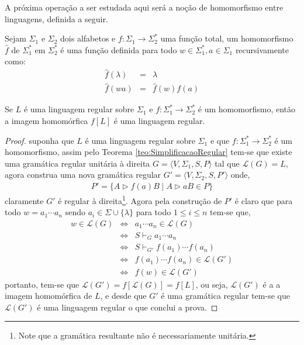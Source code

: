A próxima operação a ser estudada aqui será a noção de homomorfismo entre linguagens, definida a seguir.

\begin{definition}[Homomorfismo]
	Sejam $\Sigma_1$ e $\Sigma_2$ dois alfabetos e $f : \Sigma_1 \rightarrow \Sigma_2^*$ uma função total, um homomorfismo $\widehat{f}$ de $\Sigma_1^*$ em $\Sigma_2^*$ é uma função definida  para todo $w \in \Sigma_1^*, a \in \Sigma_1$ recursivamente como:
	\begin{eqnarray*}
		\widehat{f}(\lambda) & = & \lambda\\
		\widehat{f}(wa) & = & \widehat{f}(w)f(a)
	\end{eqnarray*}
\end{definition}

\begin{theorem}
	Se $L$ é uma linguagem regular sobre $\Sigma_1$ e $f: \Sigma^*_1 \rightarrow \Sigma_2^*$ é um homomorfismo, então a imagem homomórfica $f[L]$ é uma linguagem regular.
\end{theorem}

\begin{proof}
	suponha que $L$ é uma linguagem regular sobre  $\Sigma_1$ e que $f: \Sigma^*_1 \rightarrow \Sigma_2^*$ é um homomorfismo, assim pelo Teorema \ref{teo:SimplificacaoRegular} tem-se que existe uma gramática regular unitária à direita $G = \langle V, \Sigma_1, S, P \rangle$ tal que $\mathcal{L}(G) = L$, agora construa uma nova gramática regular $G' = \langle V, \Sigma_2, S, P' \rangle$ onde, 
	\begin{eqnarray*}
		P ' = \{A \rhd f(a)B \mid A \rhd aB \in P \}
	\end{eqnarray*}
	claramente $G'$ é regular à direita\footnote{Note que a gramática resultante não é necessariamente unitária.}. Agora pela construção de $P'$ é claro que para todo $w = a_1\cdots a_n$ sendo $a_i \in \Sigma \cup \{\lambda\}$ para todo $1 \leq i \leq n$ tem-se que, 
	\begin{eqnarray*}
		w \in \mathcal{L}(G) & \Longleftrightarrow & a_1\cdots a_n \in \mathcal{L}(G)\\
		& \Longleftrightarrow & S \vdash_{G} a_1\cdots a_n \\
		& \Longleftrightarrow & S \vdash_{G'} f(a_1)\cdots f(a_n)\\
		& \Longleftrightarrow & f(a_1)\cdots f(a_n) \in  \mathcal{L}(G')\\
		& \Longleftrightarrow & f(w) \in \mathcal{L}(G')
	\end{eqnarray*}
	portanto, tem-se que $\mathcal{L}(G') = f[\mathcal{L}(G)] = f[L]$, ou seja, $\mathcal{L}(G')$ é a a imagem homomórfica de $L$, e desde que $G'$ é uma gramática regular tem-se que $\mathcal{L}(G')$ é uma linguagem regular o que conclui a prova.
\end{proof}

